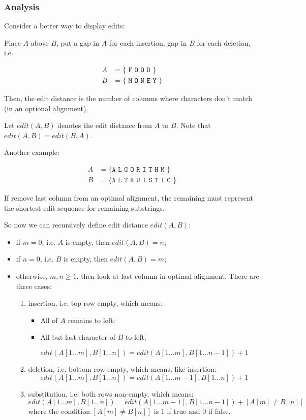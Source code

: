 \subsubsection{Analysis}

Consider a better way to display edits:

Place $A$ above $B$, put a gap in $A$ for each insertion, gap in $B$ for
each deletion, i.e.

\begin{align*}
    A &= \{\texttt{ F O O \ \ D }\} \\
    B &= \{\texttt{ M O N E Y }\}
\end{align*}

Then, the edit distance is the number of columns where characters don't
match (in an optional alignment).

Let $edit(A, B)$ denotes the edit distance from $A$ to $B$.
Note that $edit(A, B) = edit(B, A)$.

Another example:

\begin{align*}
    A &= \{\texttt{A\ L\  G\ O\ R\ \ \ I\ \ \ T\ H\ M }\} \\
    B &= \{\texttt{A\ L\ \ \ T\ R\ U\  I\  S\ T\ I\ C }\}
\end{align*}


If remove last column from an optimal alignment,
the remaining must represent the shortest edit sequence
for remaining substrings.

So now we can recursively define edit distance $edit(A, B)$:
\begin{itemize}
    \item if $m = 0$, i.e. $A$ is empty, then $edit(A, B) = n$;
    \item if $n = 0$, i.e. $B$ is empty, then $edit(A, B) = m$;
    \item otherwise, $m,n \geq 1$, then look at last column in optimal alignment.
        There are three cases:
        \begin{enumerate}[label=\alph*)]
            \item insertion, i.e. top row empty, which means:
                \begin{itemize}
                    \item All of $A$ remains to left;
                    \item All but last character of $B$ to left;
                \end{itemize}
                \[edit(A[1 \ldots m], B[1 \ldots n]) = edit(A[1 \ldots m], B[1 \ldots n-1]) + 1\]
            \item deletion, i.e. bottom row empty, which means, like insertion:
                \[edit(A[1 \ldots m], B[1 \ldots n]) = edit(A[1 \ldots m-1], B[1 \ldots n]) + 1\]
            \item substitution, i.e. both rows non-empty, which means:
                \[edit(A[1 \ldots m], B[1 \ldots n]) = edit(A[1 \ldots m-1], B[1 \ldots n-1]) + [A[m] \neq B[n]]\]
                where the condition $[A[m] \neq B[n]]$ is $1$ if true and $0$ if false.
        \end{enumerate}
\end{itemize}

